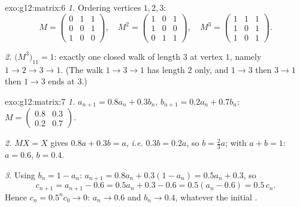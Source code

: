 \begin{solution}{exo:g12:matrix:6}
\emph{1.} Ordering vertices $1, 2, 3$:
\[
M = \begin{pmatrix} 0&1&1\\ 0&0&1\\ 1&0&0\end{pmatrix}, \quad
M^2 = \begin{pmatrix} 1&0&1\\ 1&0&0\\ 0&1&1\end{pmatrix}, \quad
M^3 = \begin{pmatrix} 1&1&1\\ 1&0&1\\ 1&0&1 \end{pmatrix}.
\]

\emph{2.} $\bigl(M^3\bigr)_{11} = 1$: exactly one closed walk of length $3$
at vertex $1$, namely $1 \to 2 \to 3 \to 1$. (The walk
$1 \to 3 \to 1$ has length $2$ only, and $1 \to 3$ then $3\to1$ then
$1\to3$ ends at $3$.)
\end{solution}

\begin{solution}{exo:g12:matrix:7}
\emph{1.} $a_{n+1} = 0.8a_n + 0.3b_n$, $b_{n+1} = 0.2a_n + 0.7b_n$:
$M = \begin{pmatrix} 0.8 & 0.3\\ 0.2 & 0.7\end{pmatrix}$.

\emph{2.} $MX = X$ gives $0.8a + 0.3b = a$, \emph{i.e.} $0.3b = 0.2a$, so
$b = \frac23 a$; with $a + b = 1$: $a = 0.6$, $b = 0.4$.

\emph{3.} Using $b_n = 1 - a_n$:
$a_{n+1} = 0.8a_n + 0.3(1 - a_n) = 0.5a_n + 0.3$, so
\[
c_{n+1} = a_{n+1} - 0.6 = 0.5a_n + 0.3 - 0.6 = 0.5(a_n - 0.6) = 0.5\,c_n .
\]
Hence $c_n = 0.5^n c_0 \to 0$: $a_n \to 0.6$ and $b_n \to 0.4$, whatever the
initial .
\end{solution}


